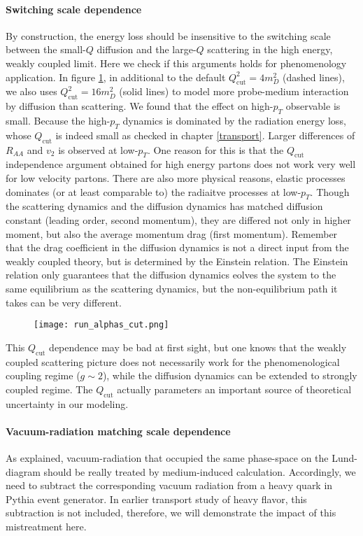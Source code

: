 \paragraph{Switching scale dependence} By construction, the energy loss should be insensitive to the switching scale between the small-$Q$ diffusion and the large-$Q$ scattering in the high energy, weakly coupled limit.
Here we check if this arguments holds for phenomenology application.
In figure \ref{fig:new:run-cut}, in additional to the default $Q_\textrm{cut}^2 = 4 m_D^2$ (dashed lines), we also uses $Q_\textrm{cut}^2 = 16 m_D^2$ (solid lines) to model more probe-medium interaction by diffusion than scattering.
We found that the effect on high-$p_T$ observable is small.
Because the high-$p_T$ dynamics is dominated by the radiation energy loss, whose $Q_\textrm{cut}$ is indeed small as checked in chapter \ref{transport}.
Larger differences of $R_{AA}$ and $v_2$ is observed at low-$p_T$.
One reason for this is that the $Q_\textrm{cut}$ independence argument obtained for high energy partons does not work very well for low velocity partons.
There are also more physical reasons, elastic processes dominates (or at least comparable to) the radiaitve processes at low-$p_T$.
Though the scattering dynamics and the diffusion dynamics has matched  diffusion constant (leading order, second momentum), they are differed not only in higher moment, but also the average momentum drag (first momentum).
Remember that the drag coefficient in the diffusion dynamics is not a direct input from the weakly coupled theory, but is determined by the Einstein relation.
The Einstein relation only guarantees that the diffusion dynamics eolves the system to the same equilibrium as the scattering dynamics, but the non-equilibrium path it takes can be very different.
\begin{figure}
\centering
\texttt{[image: run\_alphas\_cut.png]}
\caption{}
\label{fig:new:run-cut}
\end{figure}

This $Q_\textrm{cut}$ dependence may be bad at first sight, but one knows that the weakly coupled scattering picture does not necessarily work for the phenomenological coupling regime ($g\sim 2$), while the diffusion dynamics can be extended to strongly coupled regime.
The $Q_\textrm{cut}$ actually parameters an important source of theoretical uncertainty in our modeling.

\paragraph{Vacuum-radiation matching scale dependence}
As explained, vacuum-radiation that occupied the same phase-space on the Lund-diagram should be really treated by medium-induced calculation.
Accordingly, we need to subtract the corresponding vacuum radiation from a heavy quark in Pythia event generator.
In earlier transport study of heavy flavor, this subtraction is not included, therefore, we will demonstrate the impact of this mistreatment here.

